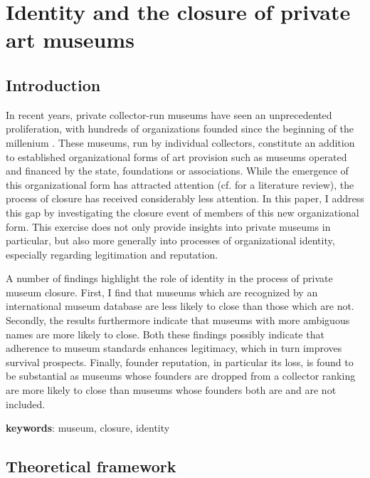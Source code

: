 \documentclass[12pt]{article}
\author{Johannes }
\date{\today}
\title{}
\begin{document}
\section*{Identity and the closure of private art museums}



\subsection*{Introduction}


In recent years, private collector-run museums have seen an unprecedented proliferation, with hundreds of organizations founded since the beginning of the millenium \parencite{Velthuis_etal_2023_boom,LarrysList_2015_report}.
These museums, run by individual collectors, constitute an addition to established organizational forms of art provision such as museums operated and financed by the state, foundations or associations.
While the emergence of this organizational form has attracted attention (cf. \cite{Kolbe_etal_2022_privatemuseum} for a literature review), the process of closure has received considerably less attention.
In this paper, I address this gap by investigating the closure event of members of this new organizational form.
This exercise does not only provide insights into private museums in particular, but also more generally into processes of organizational identity, especially regarding legitimation and reputation. 


A number of findings highlight the role of identity in the process of private museum closure. 
First, I find that museums which are recognized by an international museum database are less likely to close than those which are not.
Secondly, the results furthermore indicate that museums with more ambiguous names are more likely to close.
Both these findings possibly indicate that adherence to museum standards enhances legitimacy, which in turn improves survival prospects.
Finally, founder reputation, in particular its loss, is found to be substantial as museums whose founders are dropped from a collector ranking are more likely to close than museums whose founders both are and are not included.

\bigbreak
\noindent
\textbf{keywords}: museum, closure, identity

\subsection*{Theoretical framework}
\end{document}
